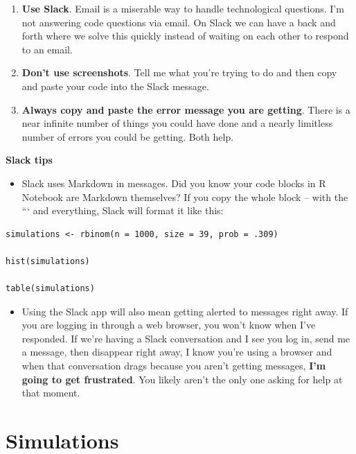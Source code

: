 \documentclass[
]{book}
\providecommand{\tightlist}{%
  \setlength{\itemsep}{0pt}\setlength{\parskip}{0pt}}
\begin{document}
\begin{enumerate}
\def\labelenumi{\arabic{enumi}.}
\tightlist
\item
  \textbf{Use Slack}. Email is a miserable way to handle technological questions. I'm not answering code questions via email. On Slack we can have a back and forth where we solve this quickly instead of waiting on each other to respond to an email.
\item
  \textbf{Don't use screenshots}. Tell me what you're trying to do and then copy and paste your code into the Slack message.
\item
  \textbf{Always copy and paste the error message you are getting}. There is a near infinite number of things you could have done and a nearly limitless number of errors you could be getting. Both help.
\end{enumerate}

\textbf{Slack tips}

\begin{itemize}
\tightlist
\item
  Slack uses Markdown in messages. Did you know your code blocks in R Notebook are Markdown themselves? If you copy the whole block -- with the ``` and everything, Slack will format it like this:
\end{itemize}

\begin{verbatim}
simulations <- rbinom(n = 1000, size = 39, prob = .309)

hist(simulations)

table(simulations)
\end{verbatim}

\begin{itemize}
\tightlist
\item
  Using the Slack app will also mean getting alerted to messages right away. If you are logging in through a web browser, you won't know when I've responded. If we're having a Slack conversation and I see you log in, send me a message, then disappear right away, I know you're using a browser and when that conversation drags because you aren't getting messages, \textbf{I'm going to get frustrated}. You likely aren't the only one asking for help at that moment.
\end{itemize}

\hypertarget{simulations}{%
\chapter{Simulations}\label{simulations}}
\end{document}
